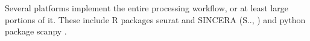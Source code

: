 Several platforms implement the entire processing workflow, or at least large portions of it.
These include R packages seurat \cite{} and SINCERA (S.., \cite{}) and python package scanpy \cite{}. 



















